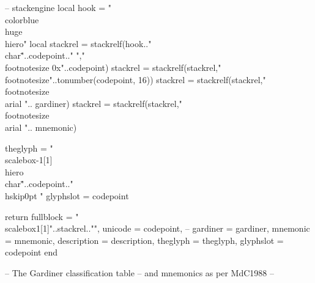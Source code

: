 \documentclass{article}
\begin{document}
\begin{luacode*}
-- stackengine 
   local hook = "\\color{blue}\\huge\\hiero"
   local stackrel = stackrelf(hook.."\\char\""..codepoint.." ","\\footnotesize 0x"..codepoint)
   stackrel = stackrelf(stackrel,"\\footnotesize"..tonumber(codepoint, 16))
   stackrel = stackrelf(stackrel,"\\footnotesize \\arial ".. gardiner)
stackrel = stackrelf(stackrel,"\\footnotesize \\arial ".. mnemonic)
  
  theglyph = "\\scalebox{-1}[1]{\\hiero\\char\""..codepoint.."\\hskip0pt }"
  glyphslot = codepoint


return {  fullblock     = "\\scalebox{1}[1]{"..stackrel.."}", 
          unicode       = codepoint, --
          gardiner      = gardiner,
          mnemonic      = mnemonic,
          description   = description,
          theglyph      = theglyph,
          glyphslot     = codepoint}
end

-- The Gardiner classification table
-- and mnemonics as per MdC1988 
--   


\end{luacode*}
\end{document}
